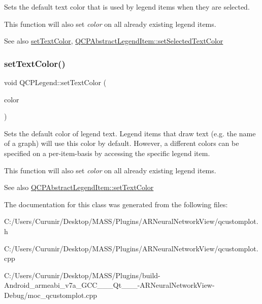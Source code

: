 Sets the default text color that is used by legend items when they are selected.

This function will also set {\itshape color} on all already existing legend items.

\begin{DoxySeeAlso}{See also}
\hyperlink{class_q_c_p_legend_ae1eb239ff4a4632fe1b6c3e668d845c6}{set\+Text\+Color}, \hyperlink{class_q_c_p_abstract_legend_item_a4d01d008ee1a5bfe9905b0397a421936}{Q\+C\+P\+Abstract\+Legend\+Item\+::set\+Selected\+Text\+Color} 
\end{DoxySeeAlso}
\mbox{\label{class_q_c_p_legend_ae1eb239ff4a4632fe1b6c3e668d845c6}} 
\subsubsection{\texorpdfstring{set\+Text\+Color()}{setTextColor()}}
{\footnotesize\ttfamily void Q\+C\+P\+Legend\+::set\+Text\+Color (\begin{DoxyParamCaption}\item[{const Q\+Color \&}]{color }\end{DoxyParamCaption})}

Sets the default color of legend text. Legend items that draw text (e.\+g. the name of a graph) will use this color by default. However, a different colors can be specified on a per-\/item-\/basis by accessing the specific legend item.

This function will also set {\itshape color} on all already existing legend items.

\begin{DoxySeeAlso}{See also}
\hyperlink{class_q_c_p_abstract_legend_item_a6ebace6aaffaedcdab2d74e88acc2d1e}{Q\+C\+P\+Abstract\+Legend\+Item\+::set\+Text\+Color} 
\end{DoxySeeAlso}


The documentation for this class was generated from the following files\+:\begin{DoxyCompactItemize}
\item 
C\+:/\+Users/\+Curunir/\+Desktop/\+M\+A\+S\+S/\+Plugins/\+A\+R\+Neural\+Network\+View/qcustomplot.\+h\item 
C\+:/\+Users/\+Curunir/\+Desktop/\+M\+A\+S\+S/\+Plugins/\+A\+R\+Neural\+Network\+View/qcustomplot.\+cpp\item 
C\+:/\+Users/\+Curunir/\+Desktop/\+M\+A\+S\+S/\+Plugins/build-\/\+Android\+\_\+armeabi\+\_\+v7a\+\_\+\+G\+C\+C\+\_\+\_\+\_\+\+Qt\+\_\+\_\+\_-\/\+A\+R\+Neural\+Network\+View-\/\+Debug/moc\+\_\+qcustomplot.\+cpp\end{DoxyCompactItemize}
